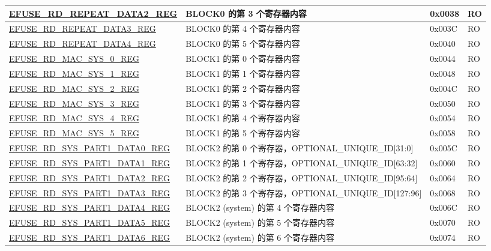 \begin{longtable}{ | p{5.8cm} | p{7cm} | p{1.3cm} | p{1.2cm} | }
\hyperref[regdesc:EFUSERDREPEATDATA2REG]{EFUSE\_RD\_REPEAT\_DATA2\_REG} & BLOCK0 的第 3 个寄存器内容 & 0x0038 & RO \\ \hline
\hyperref[regdesc:EFUSERDREPEATDATA3REG]{EFUSE\_RD\_REPEAT\_DATA3\_REG} & BLOCK0 的第 4 个寄存器内容 & 0x003C & RO \\ \hline
\hyperref[regdesc:EFUSERDREPEATDATA4REG]{EFUSE\_RD\_REPEAT\_DATA4\_REG} & BLOCK0 的第 5 个寄存器内容 & 0x0040 & RO \\ \hline
\hyperref[regdesc:EFUSERDMACSYS0REG]{EFUSE\_RD\_MAC\_SYS\_0\_REG} & BLOCK1 的第 0 个寄存器内容 & 0x0044 & RO \\ \hline
\hyperref[regdesc:EFUSERDMACSYS1REG]{EFUSE\_RD\_MAC\_SYS\_1\_REG} & BLOCK1 的第 1 个寄存器内容 & 0x0048 & RO \\ \hline
\hyperref[regdesc:EFUSERDMACSYS2REG]{EFUSE\_RD\_MAC\_SYS\_2\_REG} & BLOCK1 的第 2 个寄存器内容 & 0x004C & RO \\ \hline
\hyperref[regdesc:EFUSERDMACSYS3REG]{EFUSE\_RD\_MAC\_SYS\_3\_REG} & BLOCK1 的第 3 个寄存器内容 & 0x0050 & RO \\ \hline
\hyperref[regdesc:EFUSERDMACSYS4REG]{EFUSE\_RD\_MAC\_SYS\_4\_REG} & BLOCK1 的第 4 个寄存器内容 & 0x0054 & RO \\ \hline
\hyperref[regdesc:EFUSERDMACSYS5REG]{EFUSE\_RD\_MAC\_SYS\_5\_REG} & BLOCK1 的第 5 个寄存器内容 & 0x0058 & RO \\ \hline
\hyperref[regdesc:EFUSERDSYSPART1DATA0REG]{EFUSE\_RD\_SYS\_PART1\_DATA0\_REG} & BLOCK2 的第 0 个寄存器，OPTIONAL\_UNIQUE\_ID[31:0] & 0x005C & RO \\ \hline
\hyperref[regdesc:EFUSERDSYSPART1DATA1REG]{EFUSE\_RD\_SYS\_PART1\_DATA1\_REG} & BLOCK2 的第 1 个寄存器，OPTIONAL\_UNIQUE\_ID[63:32] & 0x0060 & RO \\ \hline
\hyperref[regdesc:EFUSERDSYSPART1DATA2REG]{EFUSE\_RD\_SYS\_PART1\_DATA2\_REG} & BLOCK2 的第 2 个寄存器，OPTIONAL\_UNIQUE\_ID[95:64] & 0x0064 & RO \\ \hline
\hyperref[regdesc:EFUSERDSYSPART1DATA3REG]{EFUSE\_RD\_SYS\_PART1\_DATA3\_REG} & BLOCK2 的第 3 个寄存器，OPTIONAL\_UNIQUE\_ID[127:96] & 0x0068 & RO \\ \hline
\hyperref[regdesc:EFUSERDSYSPART1DATA4REG]{EFUSE\_RD\_SYS\_PART1\_DATA4\_REG} & BLOCK2 (system) 的第 4 个寄存器内容 & 0x006C & RO \\ \hline
\hyperref[regdesc:EFUSERDSYSPART1DATA5REG]{EFUSE\_RD\_SYS\_PART1\_DATA5\_REG} & BLOCK2 (system) 的第 5 个寄存器内容 & 0x0070 & RO \\ \hline
\hyperref[regdesc:EFUSERDSYSPART1DATA6REG]{EFUSE\_RD\_SYS\_PART1\_DATA6\_REG} & BLOCK2 (system) 的第 6 个寄存器内容 & 0x0074 & RO \\ \hline

\end{longtable}
